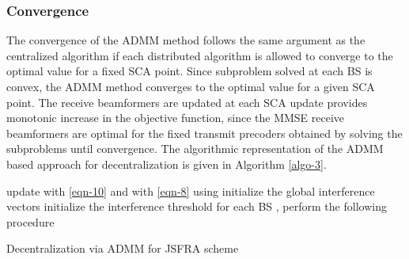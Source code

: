 \subsubsection*{Convergence}
The convergence of the \ac{ADMM} method follows the same argument as the centralized algorithm if each distributed algorithm is allowed to converge to the optimal value for a fixed \ac{SCA} point. Since subproblem solved at each \ac{BS} is convex, the \ac{ADMM} method converges to the optimal value \cite{boyd2011distributed} for a given \ac{SCA} point. The receive beamformers are updated at each \ac{SCA} update provides monotonic increase in the objective function, since the \ac{MMSE} receive beamformers are optimal for the fixed transmit precoders obtained by solving the subproblems until convergence. The algorithmic representation of the \ac{ADMM} based approach for decentralization is given in Algorithm \ref{algo-3}.
\begin{algorithm}
 \SetAlgoLined
 \DontPrintSemicolon
 \BlankLine
 update  with \eqref{eqn-10} and  with \eqref{eqn-8} using  \;
 initialize the global interference vectors  \;
 initialize the interference threshold  \;
 for each \ac{BS} , perform the following procedure \;
 \caption{Decentralization via \ac{ADMM} for \acs{JSFRA} scheme}
  \label{algo-3}
\end{algorithm}


